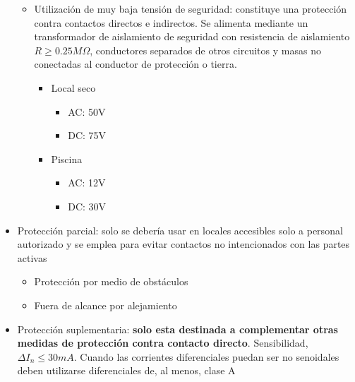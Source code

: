 \begin{itemize}
\begin{itemize}
		\item Utilización de muy baja tensión de seguridad: constituye una protección contra contactos directos e indirectos. Se alimenta mediante un transformador de aislamiento de seguridad con resistencia de aislamiento $R\ge 0.25M\Omega$, conductores separados de otros circuitos y masas no conectadas al conductor de protección o tierra.
		\begin{itemize}
			\item Local seco
			\begin{itemize}
				\item AC: 50V
				\item DC: 75V
			\end{itemize} 
			\item Piscina
			\begin{itemize}
				\item AC: 12V
				\item DC: 30V
			\end{itemize} 
		\end{itemize}
	\end{itemize}
	\item Protección parcial: solo se debería usar en locales accesibles solo a personal autorizado y se emplea para evitar contactos no intencionados con las partes activas
	\begin{itemize}
		\item Protección por medio de obstáculos
		\item Fuera de alcance por alejamiento
	\end{itemize}
	\item Protección suplementaria: \textbf{solo esta destinada a complementar otras medidas de protección contra contacto directo}. Sensibilidad, $\Delta I_n\le 30 mA$.
	Cuando las corrientes diferenciales puedan ser no senoidales
	deben utilizarse diferenciales de, al menos, clase A
\end{itemize}
